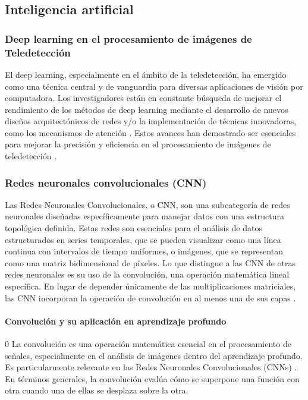         \subsection{Inteligencia artificial}            
            \subsubsection{Deep learning en el procesamiento de imágenes de Teledetección}
                El deep learning, especialmente en el ámbito de la teledetección, ha emergido como una técnica central y de vanguardia para diversas aplicaciones de visión por computadora. Los investigadores están en constante búsqueda de mejorar el rendimiento de los métodos de deep learning mediante el desarrollo de nuevos diseños arquitectónicos de redes y/o la implementación de técnicas innovadoras, como los mecanismos de atención \autocite{ghaffarian2021effect}. Estos avances han demostrado ser esenciales para mejorar la precisión y eficiencia en el procesamiento de imágenes de teledetección \autocite{wang2022review}.
                
            \subsubsection{Redes neuronales convolucionales (CNN)}
                Las Redes Neuronales Convolucionales, o CNN, son una subcategoría de redes neuronales diseñadas específicamente para manejar datos con una estructura topológica definida. Estas redes son esenciales para el análisis de datos estructurados en series temporales, que se pueden visualizar como una línea continua con intervalos de tiempo uniformes, o imágenes, que se representan como una matriz bidimensional de píxeles. Lo que distingue a las CNN de otras redes neuronales es su uso de la convolución, una operación matemática lineal específica. En lugar de depender únicamente de las multiplicaciones matriciales, las CNN incorporan la operación de convolución en al menos una de sus capas 
                \autocite{Goodfellow2016}.

                \paragraph{Convolución y su aplicación en aprendizaje profundo}0
                    La convolución es una operación matemática esencial en el procesamiento de señales, especialmente en el análisis de imágenes dentro del aprendizaje profundo. Es particularmente relevante en las Redes Neuronales Convolucionales (CNNs) \autocite{Goodfellow2016}. En términos generales, la convolución evalúa cómo se superpone una función con otra cuando una de ellas se desplaza sobre la otra.
                    
